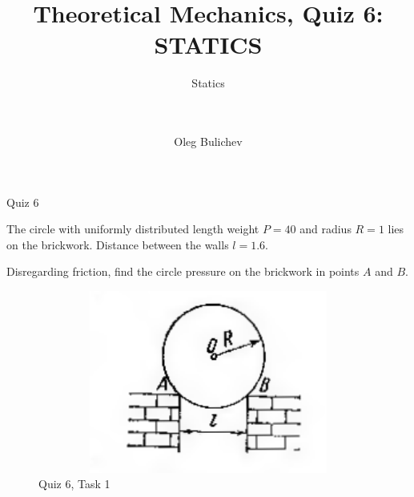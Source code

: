 \documentclass[aspectratio=169,xcolor=table,10pt, notes=hide]{beamer}
\title[Theoretical Mechanics]{Theoretical Mechanics, Quiz 6: STATICS} %
\subtitle{Statics \\ \  \\ \  } %
\author{Oleg Bulichev}
\newcommand{\fbckg}[1]{\usebackgroundtemplate{\texttt{[image: \#1]}}}%
\begin{document}
\setlength{\abovedisplayskip}{0pt}
\setlength{\belowdisplayskip}{0pt}
\setlength{\abovedisplayshortskip}{0pt}
\setlength{\belowdisplayshortskip}{0pt}

\fbckg{fibeamer/figs/title_page.png}

\note{}

\fbckg{fibeamer/figs/common.png}

\begin{frame}[t]{Quiz 6}
  \begin{minipage}{0.6\textwidth}
    The circle with uniformly distributed length weight $P= 40$ and radius $R=1$ lies on the brickwork. Distance between the walls $l=1.6$. 
    \medskip

    Disregarding friction, find the circle pressure on the brickwork in points $A$ and $B$.
  \end{minipage}
  \begin{minipage}{0.39\textwidth}
    \begin{figure}[H]
      \centering\includegraphics[height=6cm,width=1\textwidth,keepaspectratio]{quiz6_1}
      \caption*{Quiz 6, Task 1}
    \end{figure}
  \end{minipage}
\end{frame}
\end{document}
